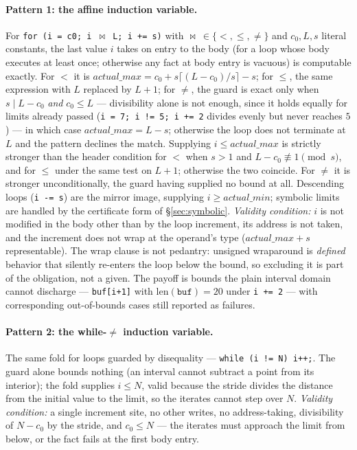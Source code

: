 \documentclass[11pt,a4paper]{article}
\begin{document}
\paragraph{Pattern 1: the affine induction variable.} For
\texttt{for (i = c0; i $\bowtie$ L; i += s)} with $\bowtie\ \in \{<, \le, \ne\}$ and
$c_0, L, s$ literal constants, the last value $i$ takes on entry to the body (for a loop
whose body executes at least once; otherwise any fact at body entry is vacuous) is
computable exactly. For $<$ it is
$\mathit{actual\_max} = c_0 + s\lceil (L - c_0)/s \rceil - s$; for $\le$, the same
expression with $L$ replaced by $L+1$; for $\ne$, the guard is exact only when
$s \mid L - c_0$ \emph{and} $c_0 \le L$ --- divisibility alone is not enough, since it
holds equally for limits already passed (\texttt{i = 7; i != 5; i += 2} divides evenly
but never reaches $5$) --- in which case $\mathit{actual\_max} = L - s$; otherwise the
loop does not terminate at $L$ and the pattern declines the match.
Supplying $i \le \mathit{actual\_max}$ is strictly stronger than the header condition for
$<$ when $s > 1$ and $L - c_0 \not\equiv 1 \pmod{s}$, and for $\le$ under the same test on
$L+1$; otherwise the two coincide. For $\ne$ it is stronger unconditionally, the guard
having supplied no bound at all. Descending loops
(\texttt{i -= s}) are the mirror image, supplying $i \ge \mathit{actual\_min}$; symbolic
limits are handled by the certificate form of \S\ref{sec:symbolic}.
\emph{Validity condition:} $i$ is not modified in the body other than by the loop
increment, its address is not taken, and the increment does not wrap at the operand's
type ($\mathit{actual\_max} + s$ representable). The wrap clause is not pedantry:
unsigned wraparound is \emph{defined} behavior that silently re-enters the loop below the
bound, so excluding it is part of the obligation, not a given. The
payoff is bounds the plain interval domain cannot discharge --- \texttt{buf[i+1]} with
$\mathrm{len}(\mathtt{buf}) = 20$ under \texttt{i += 2} --- with corresponding
out-of-bounds cases still reported as failures.

\paragraph{Pattern 2: the while-$\ne$ induction variable.} The same fold for loops
guarded by disequality --- \texttt{while (i != N) i++;}. The guard alone bounds nothing
(an interval cannot subtract a point from its interior); the fold supplies $i \le N$,
valid because the stride divides the distance from the initial value to the limit, so the
iterates cannot step over $N$. \emph{Validity condition:} a single increment site, no
other writes, no address-taking, divisibility of $N - c_0$ by the stride, and
$c_0 \le N$ --- the iterates must approach the limit from below, or the fact fails at the
first body entry.
\end{document}
